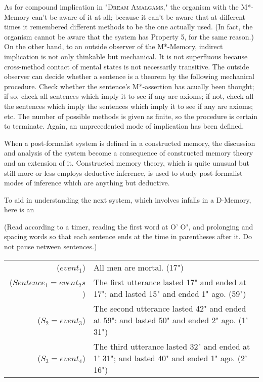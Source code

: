 As for compound implication in "\textsc{Dream Amalgams,}" the organism 
with the M*-Memory can't be aware of it at all; because it can't be aware 
that at different times it remembered different methods to be the one 
actually used. (In fact, the organism cannot be aware that the system has 
Property 5, for the same reason.) On the other hand, to an outside observer 
of the M*-Memory, indirect implication is not only thinkable but 
mechanical. It is not superfluous because cross-method contact of mental 
states is not necessarily transitive. The outside observer can decide whether a 
sentence is a theorem by the following mechanical procedure. Check 
whether the sentence's M*-assertion has acually been thought; if so, check all 
sentences which imply it to see if any are axioms; if not, check all the 
sentences which imply the sentences which imply it to see if any are axioms; 
etc. The number of possible methods is given as finite, so the procedure is 
certain to terminate. Again, an unprecedented mode of implication has been 
defined. 

When a post-formalist system is defined in a constructed memory, the 
discussion and analysis of the system become a consequence of constructed 
memory theory and an extension of it. Constructed memory theory, which 
is quite unusual but still more or less employs deductive inference, is used to 
study post-formalist modes of inference which are anything but deductive. 

To aid in understanding the next system, which involves infalls in a 
D-Memory, here is an 

{ \centering \large {} \par}

(Read according to a timer, reading the first word at O' O", and prolonging 
and spacing words so that each sentence ends at the time in parentheses after 
it. Do not pause netween sentences.) 

\begin{tabular}{ r l }
	($event_1$) &  All men are mortal. (17") \\

	($Sentence_1=event_2s$) &  The first utterance lasted 17" and ended at 17"; and lasted 15" and ended 1" ago. (59") \\

	($S_2=event_3$) & The second utterance lasted 42" and ended at 59": and lasted 50" and ended 2" ago. (1' 31") \\

	($S_3=event_4$) & The third utterance lasted 32" and ended at 1' 31"; and lasted 40" and ended 1" ago. (2' 16") \\
\end{tabular}

